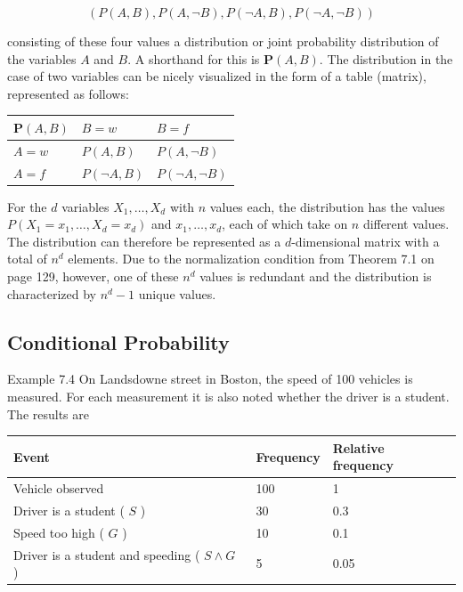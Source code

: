 \documentclass[10pt]{book}
\begin{document}
$$
(P(A, B), P(A, \neg B), P(\neg A, B), P(\neg A, \neg B))
$$

consisting of these four values a distribution or joint probability distribution of the variables $A$ and $B$. A shorthand for this is $\boldsymbol{P}(A, B)$. The distribution in the case of two variables can be nicely visualized in the form of a table (matrix), represented as follows:

\begin{center}
\begin{tabular}{lll}
\hline
$\boldsymbol{P}(A, B)$ & $B=w$ & $B=f$ \\
\hline
$A=w$ & $P(A, B)$ & $P(A, \neg B)$ \\
\hline
$A=f$ & $P(\neg A, B)$ & $P(\neg A, \neg B)$ \\
\hline
\end{tabular}
\end{center}

For the $d$ variables $X_{1}, \ldots, X_{d}$ with $n$ values each, the distribution has the values $P\left(X_{1}=x_{1}, \ldots, X_{d}=x_{d}\right)$ and $x_{1}, \ldots, x_{d}$, each of which take on $n$ different values. The distribution can therefore be represented as a $d$-dimensional matrix with a total of $n^{d}$ elements. Due to the normalization condition from Theorem 7.1 on page 129, however, one of these $n^{d}$ values is redundant and the distribution is characterized by $n^{d}-1$ unique values.

\subsection{Conditional Probability}
Example 7.4 On Landsdowne street in Boston, the speed of 100 vehicles is measured. For each measurement it is also noted whether the driver is a student. The results are

\begin{center}
\begin{tabular}{|l|l|l|}
\hline
Event & Frequency & Relative frequency \\
\hline
Vehicle observed & 100 & 1 \\
\hline
Driver is a student ( $S$ ) & 30 & 0.3 \\
\hline
Speed too high ( $G$ ) & 10 & 0.1 \\
\hline
Driver is a student and speeding ( $S \wedge G$ ) & 5 & 0.05 \\
\hline
\end{tabular}
\end{center}
\end{document}
